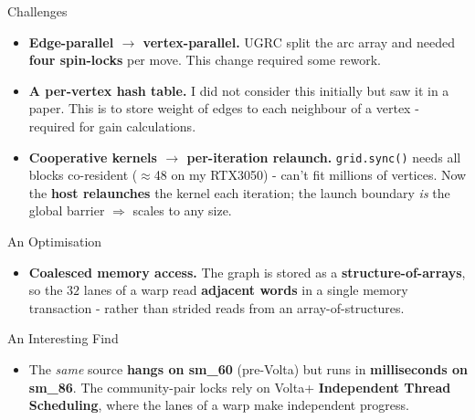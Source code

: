 \documentclass[aspectratio=169]{beamer}
\begin{document}
\begin{frame}{Challenges}
    \begin{itemize}
        \item \textbf{Edge-parallel $\to$ vertex-parallel.} UGRC split the arc array and needed
        \textbf{four spin-locks} per move. This change required some rework.
        \vspace{0.5em}
        \item \textbf{A per-vertex hash table.} I did not consider this initially but saw it in a paper. This is to store weight of edges to each neighbour of a vertex - required for gain calculations.
        \vspace{0.5em}
        \item \textbf{Cooperative kernels $\to$ per-iteration relaunch.} \texttt{grid.sync()}
        needs all blocks co-resident ($\approx$48 on my RTX3050) - can't fit millions of
        vertices. Now the \textbf{host relaunches} the kernel each iteration; the launch
        boundary \emph{is} the global barrier $\Rightarrow$ scales to any size.
    \end{itemize}
\end{frame}

\begin{frame}{An Optimisation}
    \begin{itemize}
        \item \textbf{Coalesced memory access.} The graph is stored as a
        \textbf{structure-of-arrays}, so the $32$ lanes of a warp read \textbf{adjacent words}
        in a single memory transaction - rather than strided reads from an
        array-of-structures.
    \end{itemize}
\end{frame}

\begin{frame}{An Interesting Find}
    \begin{itemize}
        \item The \emph{same} source \textbf{hangs on sm\_60} (pre-Volta) but runs in
        \textbf{milliseconds on sm\_86}. The community-pair locks rely on Volta+
        \textbf{Independent Thread Scheduling}, where the lanes of a warp make independent
        progress.
    \end{itemize}
\end{frame}
\end{document}
